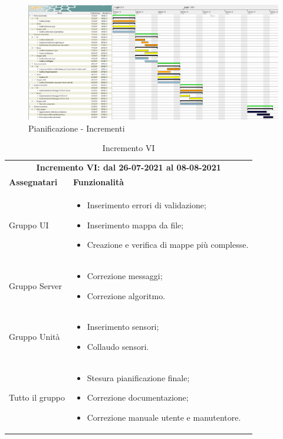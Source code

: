 \newpage
\begin{landscape}
	\begin{figure}[h!]
		\includegraphics[width=24cm]{images/6_incrementi}
		\caption{Pianificazione - Incrementi}
	\end{figure}
\end{landscape}

\begin{table} [h!]
	\begin{center}
		\begin{tabular} { m{4cm}  m{11cm}  }	
			\multicolumn{2}{c}{	\textbf{Incremento VI: dal 26-07-2021 al 08-08-2021}} \\
			\rowcolor{lightgray}
			\textbf{Assegnatari} & \textbf{Funzionalità} \\
			Gruppo UI & \begin{itemize}
			\item Inserimento errori di validazione;
			\item Inserimento mappa da file;
			\item Creazione e verifica di mappe più complesse.
			\end{itemize}\\		
			Gruppo Server & \begin{itemize}
			\item Correzione messaggi;
			\item Correzione algoritmo.
		\end{itemize}\\		
		Gruppo Unità &  \begin{itemize}
			\item Inserimento sensori;
			\item Collaudo sensori.
		\end{itemize}\\	
		Tutto il gruppo &  \begin{itemize}
			\item Stesura pianificazione finale;
			\item Correzione documentazione;
			\item Correzione manuale utente e manutentore.
		\end{itemize}\\			
			
		\end{tabular}
		\caption{Incremento VI}
	\end{center}
\end{table}


